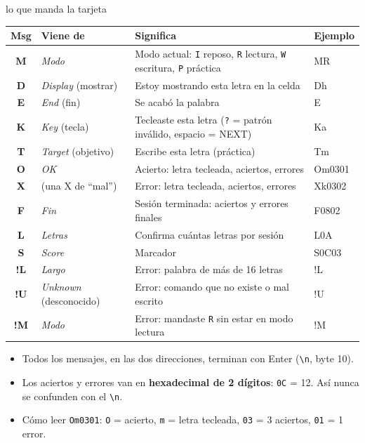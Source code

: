 \documentclass[11pt,a4paper]{article}
\newcommand{\cod}[1]{\texttt{#1}}
\begin{document}
\vspace{8pt}
\hfill{\small\color{gris}lo que manda la tarjeta}\par
\vspace{4pt}
\noindent{}
\begin{tabularx}{\linewidth}{>{\ttfamily\bfseries\large}c >{\raggedright}p{2.6cm} L >{\ttfamily}p{1.8cm}}
\toprule
{}\normalfont\normalsize\textbf{Msg} & \textbf{Viene de} & \textbf{Significa} & \normalfont\textbf{Ejemplo} \\
\midrule
M & \textit{Modo} & Modo actual: \cod{I} reposo, \cod{R} lectura, \cod{W} escritura, \cod{P} práctica & MR \\
D & \textit{Display} (mostrar) & Estoy mostrando esta letra en la celda & Dh \\
E & \textit{End} (fin) & Se acabó la palabra & E \\
K & \textit{Key} (tecla) & Tecleaste esta letra (\cod{?} = patrón inválido, espacio = NEXT) & Ka \\
T & \textit{Target} (objetivo) & Escribe esta letra (práctica) & Tm \\
O & \textit{OK} & Acierto: letra tecleada, aciertos, errores & Om0301 \\
X & (una X de ``mal'') & Error: letra tecleada, aciertos, errores & Xk0302 \\
F & \textit{Fin} & Sesión terminada: aciertos y errores finales & F0802 \\
L & \textit{Letras} & Confirma cuántas letras por sesión & L0A \\
S & \textit{Score} & Marcador & S0C03 \\
!L & \textit{Largo} & Error: palabra de más de 16 letras & !L \\
!U & \textit{Unknown} (desconocido) & Error: comando que no existe o mal escrito & !U \\
!M & \textit{Modo} & Error: mandaste \cod{R} sin estar en modo lectura & !M \\
\bottomrule
\end{tabularx}

\vspace{8pt}
\begin{tcolorbox}[colback=verdesuave,colframe=verde,arc=1.5mm,boxrule=0.6pt,title=\bfseries Recuerda,fonttitle=\small]
\begin{itemize}\setlength{\itemsep}{1pt}
  \item Todos los mensajes, en las dos direcciones, terminan con Enter (\cod{\textbackslash n}, byte 10).
  \item Los aciertos y errores van en \textbf{hexadecimal de 2 dígitos}: \cod{0C} = 12. Así nunca se confunden con el \cod{\textbackslash n}.
  \item Cómo leer \cod{Om0301}: \cod{O} = acierto, \cod{m} = letra tecleada, \cod{03} = 3 aciertos, \cod{01} = 1 error.
\end{itemize}
\end{tcolorbox}
\end{document}
